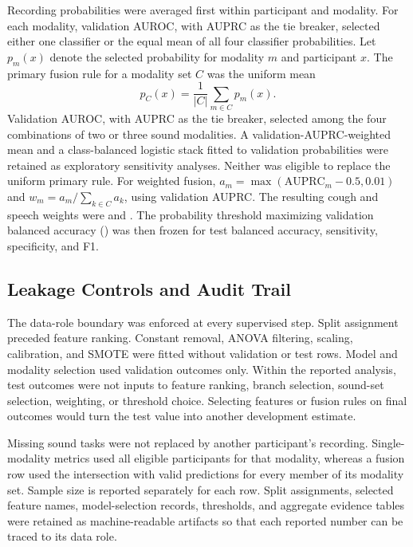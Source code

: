 \documentclass[conference]{IEEEtran}
\begin{document}
Recording probabilities were averaged first within participant and modality.
For each modality, validation AUROC, with AUPRC as the tie breaker, selected
either one classifier or the equal mean of all four classifier probabilities.
Let $p_m(x)$ denote the selected probability for modality $m$ and participant
$x$. The primary fusion rule for a modality set $C$ was the
uniform mean
\begin{equation}
p_C(x)=\frac{1}{|C|}\sum_{m\in C}p_m(x).
\label{eq:fusion}
\end{equation}
Validation AUROC, with AUPRC as the tie breaker, selected among the four
combinations of two or three sound modalities. A validation-AUPRC-weighted mean and a class-balanced
logistic stack fitted to validation probabilities were retained as exploratory
sensitivity analyses. Neither was eligible to replace the uniform primary
rule. For weighted fusion, $a_m=\max(\mathrm{AUPRC}_m-0.5,0.01)$ and
$w_m=a_m/\sum_{k\in C}a_k$, using validation AUPRC. The resulting cough and
speech weights were \CoughFusionWeight{} and \SpeechFusionWeight{}. The probability
threshold maximizing validation balanced accuracy (\FusionThreshold{}) was
then frozen for test balanced accuracy, sensitivity, specificity, and F1.

\subsection{Leakage Controls and Audit Trail}

The data-role boundary was enforced at every supervised step. Split assignment
preceded feature ranking. Constant removal, ANOVA filtering, scaling,
calibration, and SMOTE were fitted without validation or test rows. Model and
modality selection used validation outcomes only. Within the reported analysis,
test outcomes were not inputs to feature ranking, branch selection, sound-set
selection, weighting, or threshold choice. Selecting features or fusion rules
on final outcomes would turn the test value into another development estimate.

Missing sound tasks were not replaced by another participant's recording.
Single-modality metrics used all eligible participants for that modality,
whereas a fusion row used the intersection with valid predictions for every
member of its modality set. Sample size is reported separately for each row.
Split assignments, selected feature names, model-selection records,
thresholds, and aggregate evidence tables were retained as machine-readable
artifacts so that each reported number can be traced to its data role.
\end{document}

